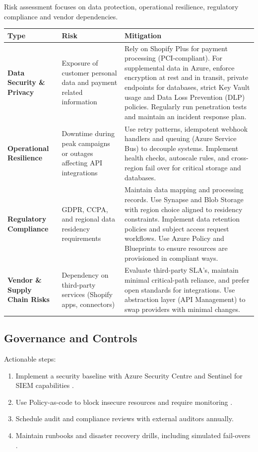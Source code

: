 \documentclass[12pt, a4paper, twoside]{article} %
\begin{document}
Risk assessment focuses on data protection, operational resilience, regulatory compliance and vendor dependencies.
\begin{center}
\begin{tabularx}{1.1\textwidth}{
 | >{\raggedright\arraybackslash}X
 | >{\raggedright\arraybackslash}X
 | >{\raggedright\arraybackslash}X |
 }
\hline
\textbf{Type} & \textbf{Risk} & \textbf{Mitigation} \\
\hline \hline
\textbf{Data Security \& Privacy} & Exposure of customer personal data and payment related information & Rely on Shopify Plus for payment processing (PCI-compliant). For supplemental data in Azure, enforce encryption at rest and in transit, private endpoints for databases, strict Key Vault usage and Data Loss Prevention (DLP) policies. Regularly run penetration tests and maintain an incident response plan. \\
\textbf{Operational Resilience} & Downtime during peak campaigns or outages affecting API integrations & Use retry patterns, idempotent webhook handlers and queuing (Azure Service Bus) to decouple systems. Implement health checks, autoscale rules, and cross-region fail over for critical storage and databases. \\
\textbf{Regulatory Compliance} & GDPR, CCPA, and regional data residency requirements & Maintain data mapping and processing records. Use Synapse and Blob Storage with region choice aligned to residency constraints. Implement data retention policies and subject access request workflows. Use Azure Policy and Blueprints to ensure resources are provisioned in compliant ways. \\
\textbf{Vendor \& Supply Chain Risks} & Dependency on third-party services (Shopify apps, connectors) & Evaluate third-party SLA's, maintain minimal critical-path reliance, and prefer open standards for integrations. Use abstraction layer (API Management) to swap providers with minimal changes. \\
\hline
\end{tabularx}
\end{center}

\subsection{Governance and Controls}
Actionable steps:
\begin{enumerate}
\item Implement a security baseline with Azure Security Centre and Sentinel for SIEM capabilities \citep{praveenborra2024}.
\item Use Policy-as-code to block insecure resources and require monitoring \citep{chuprikov2025a}.
\item Schedule audit and compliance reviews with external auditors annually.
\item Maintain runbooks and disaster recovery drills, including simulated fail-overs \citep{gupta2024}.
\end{enumerate}
\end{document}
